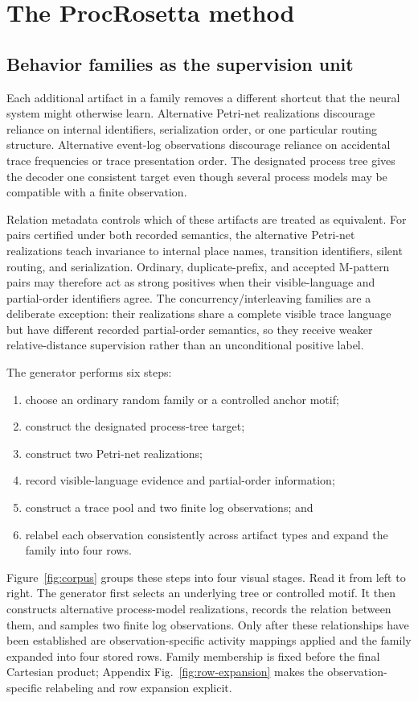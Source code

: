\documentclass[pdflatex,sn-basic]{sn-jnl}
\begin{document}
\FloatBarrier
\section{The ProcRosetta method}\label{sec:model}

\subsection{Behavior families as the supervision unit}\label{sec:corpus}

Each additional artifact in a family removes a different shortcut that the neural system might otherwise learn. Alternative Petri-net realizations discourage reliance on internal identifiers, serialization order, or one particular routing structure. Alternative event-log observations discourage reliance on accidental trace frequencies or trace presentation order. The designated process tree gives the decoder one consistent target even though several process models may be compatible with a finite observation.

Relation metadata controls which of these artifacts are treated as equivalent. For pairs certified under both recorded semantics, the alternative Petri-net realizations teach invariance to internal place names, transition identifiers, silent routing, and serialization. Ordinary, duplicate-prefix, and accepted M-pattern pairs may therefore act as strong positives when their visible-language and partial-order identifiers agree. The concurrency/interleaving families are a deliberate exception: their realizations share a complete visible trace language but have different recorded partial-order semantics, so they receive weaker relative-distance supervision rather than an unconditional positive label.

The generator performs six steps:
\begin{enumerate}
\item choose an ordinary random family or a controlled anchor motif;
\item construct the designated process-tree target;
\item construct two Petri-net realizations;
\item record visible-language evidence and partial-order information;
\item construct a trace pool and two finite log observations; and
\item relabel each observation consistently across artifact types and expand the family into four rows.
\end{enumerate}
Figure~\ref{fig:corpus} groups these steps into four visual stages. Read it from left to right. The generator first selects an underlying tree or controlled motif. It then constructs alternative process-model realizations, records the relation between them, and samples two finite log observations. Only after these relationships have been established are observation-specific activity mappings applied and the family expanded into four stored rows. Family membership is fixed before the final Cartesian product; Appendix Fig.~\ref{fig:row-expansion} makes the observation-specific relabeling and row expansion explicit.
\end{document}
